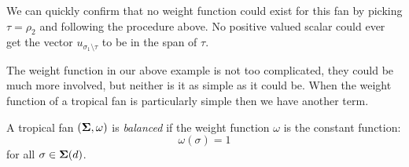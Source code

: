 \documentclass[12pt,oneside]{../../sfsuthesis}
\begin{document}
\begin{figure}[H]
\begin{subfigure}[t]{0.45\textwidth}
\begin{tikzpicture}[scale=1, baseline=(O)]
        \end{tikzpicture}
    \end{subfigure}
\end{figure}
We can quickly confirm that no weight function could exist for this fan by picking \( \tau = \rho_2 \) and following the procedure above.
No positive valued scalar could ever get the vector \( u_{\sigma_1 \setminus \tau} \) to be in the span of \( \tau \).

The weight function in our above example is not too complicated, they could be much more involved, but neither is it as simple as it could be.
When the weight function of a tropical fan is particularly simple then we have another term.
\begin{definition}\th\label{def:balanced}
    A tropical fan \( (\bSigma, \omega) \) is \emph{balanced} if the weight function \( \omega \) is the constant function:
    \[
        \omega(\sigma) = 1
    \]
    for all \( \sigma \in \bSigma(d) \).
\end{definition}
\end{document}
